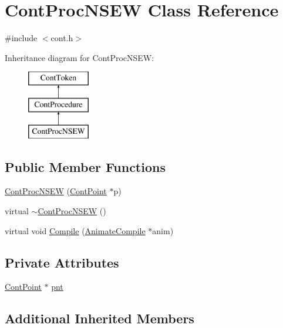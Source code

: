 \hypertarget{a00080}{\section{Cont\-Proc\-N\-S\-E\-W Class Reference}
\label{a00080}
}


{\ttfamily \#include $<$cont.\-h$>$}

Inheritance diagram for Cont\-Proc\-N\-S\-E\-W\-:\begin{figure}[H]
\begin{center}
\leavevmode
\includegraphics[height=3.000000cm]{a00080}
\end{center}
\end{figure}
\subsection*{Public Member Functions}
\begin{DoxyCompactItemize}
\item 
\hyperlink{a00080_ab7b7a01ead0bfee4ffad1f25654bedd5}{Cont\-Proc\-N\-S\-E\-W} (\hyperlink{a00062}{Cont\-Point} $\ast$p)
\item 
virtual \hyperlink{a00080_a3751cc50ce3658289376fc83f5af400e}{$\sim$\-Cont\-Proc\-N\-S\-E\-W} ()
\item 
virtual void \hyperlink{a00080_aa91db2ce7cb30ef776d9424f65c24db6}{Compile} (\hyperlink{a00007}{Animate\-Compile} $\ast$anim)
\end{DoxyCompactItemize}
\subsection*{Private Attributes}
\begin{DoxyCompactItemize}
\item 
\hyperlink{a00062}{Cont\-Point} $\ast$ \hyperlink{a00080_a741a089f18c4d9fb8df57496387e06c9}{pnt}
\end{DoxyCompactItemize}
\subsection*{Additional Inherited Members}


